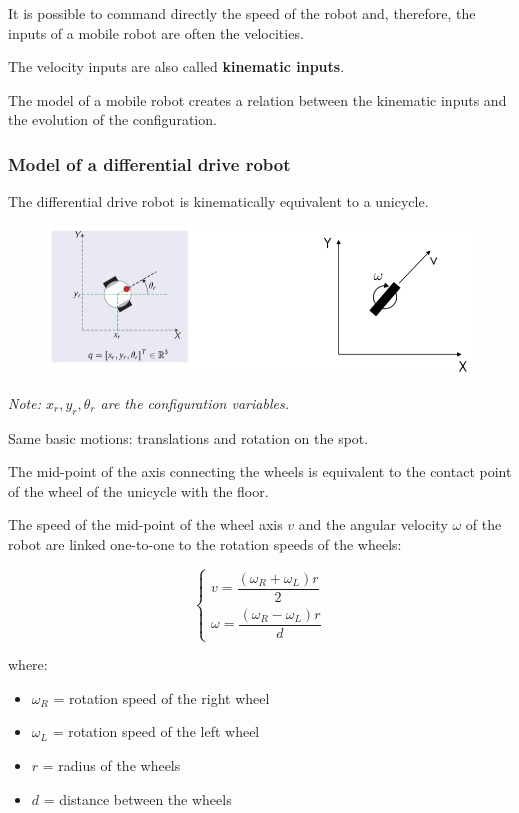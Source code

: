It is possible to command directly the speed of the robot and, therefore, the inputs of a mobile robot are often the velocities.  

The velocity inputs are also called \textbf{kinematic inputs}.  

The model of a mobile robot creates a relation between the kinematic inputs and the evolution of the configuration.

\hfill

\subsubsection{Model of a differential drive robot}

The differential drive robot is kinematically equivalent to a unicycle.  

\begin{figure}[H]
    \centering
    \includegraphics[width=1\linewidth]{imgs/diff_drive_unicycle.png}
\end{figure}

\textit{Note: $x_r, y_r, \theta_r$ are the configuration variables.}

Same basic motions: translations and rotation on the spot.  

The mid-point of the axis connecting the wheels is equivalent to the contact point of the wheel of the unicycle with the floor.  

The speed of the mid-point of the wheel axis $v$ and the angular velocity $\omega$ of the robot are linked one-to-one to the rotation speeds of the wheels:

\[
\begin{cases}
v = \dfrac{(\omega_R + \omega_L)r}{2} \\
\omega = \dfrac{(\omega_R - \omega_L)r}{d}
\end{cases}
\]

where:

\begin{itemize}
    \item $\omega_R$ = rotation speed of the right wheel  
    \item $\omega_L$ = rotation speed of the left wheel  
    \item $r$ = radius of the wheels  
    \item $d$ = distance between the wheels  
\end{itemize}

